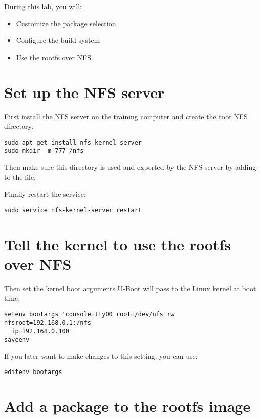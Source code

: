 
During this lab, you will:
\begin{itemize}
  \item Customize the package selection
  \item Configure the build system
  \item Use the rootfs over NFS
\end{itemize}



\section{Set up the NFS server}

First install the NFS server on the training computer and create the root NFS
directory:
\begin{verbatim}
sudo apt-get install nfs-kernel-server
sudo mkdir -m 777 /nfs
\end{verbatim}

Then make sure this directory is used and exported by the NFS server by adding
 to the  file.

Finally restart the service:
\begin{verbatim}
sudo service nfs-kernel-server restart
\end{verbatim}

\section{Tell the kernel to use the rootfs over NFS}

Then set the kernel boot arguments U-Boot will pass to the Linux kernel at boot
time:
\begin{verbatim}
setenv bootargs 'console=ttyO0 root=/dev/nfs rw nfsroot=192.168.0.1:/nfs
  ip=192.168.0.100'
saveenv
\end{verbatim}

If you later want to make changes to this setting, you can use:
\begin{verbatim}
editenv bootargs
\end{verbatim}

\section{Add a package to the rootfs image}

